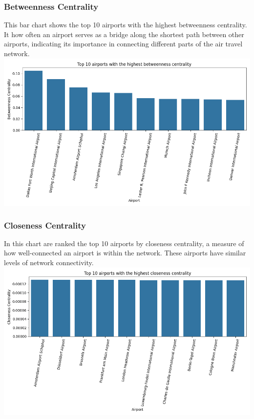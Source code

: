 \documentclass[12pt]{article}
\begin{document}
\begin{minipage}{\textwidth}
    \subsubsection{Betweenness Centrality}
    {This bar chart shows the top 10 airports with the highest betweenness centrality. It how often an airport serves as a bridge along the shortest path between other airports, indicating its importance in connecting different parts of the air travel network.}
    \centering
    \includegraphics[width=1\linewidth]{img/betweenness_centrality.png}
\end{minipage}

\begin{minipage}{\textwidth}
    \subsubsection{Closeness Centrality}
    {In this chart are ranked the top 10 airports by closeness centrality, a measure of how well-connected an airport is within the network. These airports have similar levels of network connectivity. }
    \centering
    \includegraphics[width=1\linewidth]{img/closeness_centrality.png}
\end{minipage}
\end{document}
